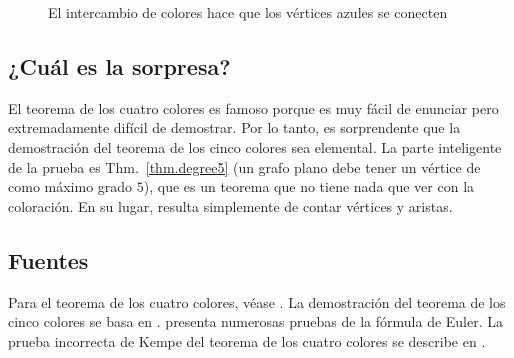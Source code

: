 \begin{figure}[ht]
\begin{minipage}{.50\textwidth}
\begin{center}
\caption{El intercambio de colores hace que los vértices azules se conecten}\label{f.five-kempe2-share}
\end{center}
\end{minipage}
\end{figure}

\subsection*{¿Cuál es la sorpresa?}

El teorema de los cuatro colores es famoso porque es muy fácil de enunciar pero extremadamente difícil de demostrar. Por lo tanto, es sorprendente que la demostración del teorema de los cinco colores sea elemental. La parte inteligente de la prueba es Thm.~\ref{thm.degree5} (un grafo plano debe tener un vértice de como máximo grado $5$), que es un teorema que no tiene nada que ver con la coloración. En su lugar, resulta simplemente de contar vértices y aristas.

\subsection*{Fuentes}

Para el teorema de los cuatro colores, véase \cite{thomas,wiki:four}. La demostración del teorema de los cinco colores se basa en \cite{thebook,wiki:five}.
\cite{eppstein} presenta numerosas pruebas de la fórmula de Euler. La prueba incorrecta de Kempe del teorema de los cuatro colores se describe en \cite{sipka}.
